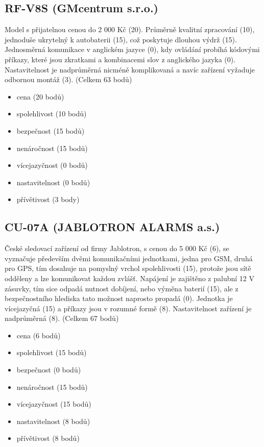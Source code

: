\documentclass[FM,BP]{tulthesis}  %
\begin{document}
\subsection{RF-V8S (GMcentrum s.r.o.)}
Model s přijatelnou cenou do 2 000 Kč (20). Průměrně kvalitní zpracování (10), jednoduše ukrytelný k autobaterii (15), což poskytuje dlouhou výdrž (15). Jednosměrná komunikace v anglickém jazyce (0), kdy ovládání probíhá kódovými příkazy, které jsou zkratkami a kombinacemi slov z anglického jazyka (0). Nastavitelnost je nadprůměrná nicméně komplikovaná a navíc zařízení vyžaduje odbornou montáž (3). (Celkem 63 bodů)

\begin{itemize}
\item cena (20 bodů)
\item spolehlivost (10 bodů)
\item bezpečnost (15 bodů)
\item nenáročnost (15 bodů)
\item vícejazyčnost (0 bodů)
\item nastavitelnost (0 bodů)
\item přívětivost (3 body)
\end{itemize}

\subsection{CU-07A (JABLOTRON ALARMS a.s.)}
České sledovací zařízení od firmy Jablotron, s cenou do 5 000 Kč (6), se vyznačuje především dvěmi komunikačními jednotkami, jedna pro GSM, druhá pro GPS, tím dosahuje na pomyslný vrchol spolehlivosti (15), protože jsou sítě odděleny a lze komunikovat každou zvlášť. Napájení je zajištěno z palubní 12 V zásuvky, tím sice odpadá nutnost dobíjení, nebo výměna baterií (15), ale z bezpečnostního hlediska tato možnost naprosto propadá (0). Jednotka je vícejazyčná (15) a příkazy jsou v rozumné formě (8). Nastavitelnost zařízení je nadprůměrná (8). (Celkem 67 bodů)

\begin{itemize}
\item cena (6 bodů)
\item spolehlivost (15 bodů)
\item bezpečnost (0 bodů)
\item nenáročnost (15 bodů)
\item vícejazyčnost (15 bodů)
\item nastavitelnost (8 bodů)
\item přívětivost (8 bodů)
\end{itemize}
\end{document}
